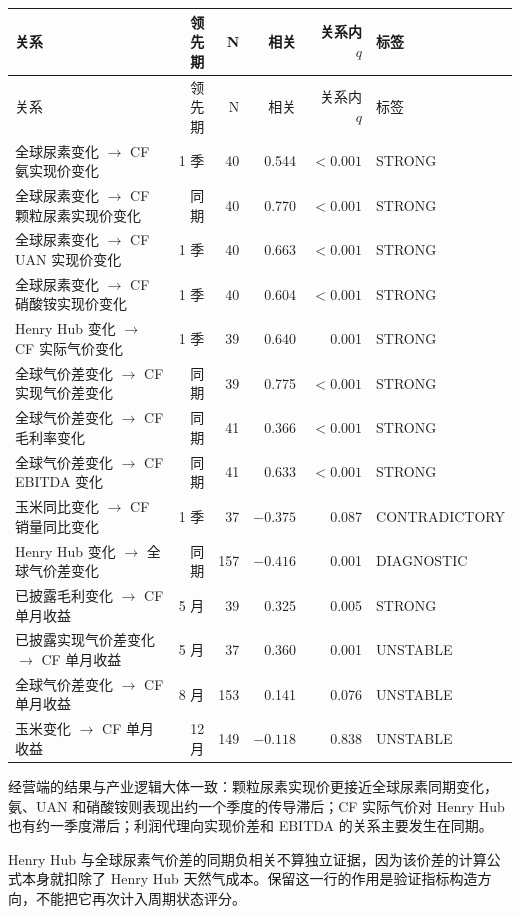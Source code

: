 \documentclass[11pt,a4paper]{ctexart}
\begin{document}
\small
\begin{longtable}{L{5.4cm}r r r r L{1.8cm}}
\toprule
关系 & 领先期 & N & 相关 & 关系内 $q$ & 标签 \\
\midrule
\endfirsthead
\toprule
关系 & 领先期 & N & 相关 & 关系内 $q$ & 标签 \\
\midrule
\endhead
全球尿素变化 $\rightarrow$ CF 氨实现价变化 & 1 季 & 40 & 0.544 & $<0.001$ & STRONG \\
全球尿素变化 $\rightarrow$ CF 颗粒尿素实现价变化 & 同期 & 40 & 0.770 & $<0.001$ & STRONG \\
全球尿素变化 $\rightarrow$ CF UAN 实现价变化 & 1 季 & 40 & 0.663 & $<0.001$ & STRONG \\
全球尿素变化 $\rightarrow$ CF 硝酸铵实现价变化 & 1 季 & 40 & 0.604 & $<0.001$ & STRONG \\
Henry Hub 变化 $\rightarrow$ CF 实际气价变化 & 1 季 & 39 & 0.640 & 0.001 & STRONG \\
全球气价差变化 $\rightarrow$ CF 实现气价差变化 & 同期 & 39 & 0.775 & $<0.001$ & STRONG \\
全球气价差变化 $\rightarrow$ CF 毛利率变化 & 同期 & 41 & 0.366 & $<0.001$ & STRONG \\
全球气价差变化 $\rightarrow$ CF EBITDA 变化 & 同期 & 41 & 0.633 & $<0.001$ & STRONG \\
玉米同比变化 $\rightarrow$ CF 销量同比变化 & 1 季 & 37 & $-0.375$ & 0.087 & CONTRADICTORY \\
Henry Hub 变化 $\rightarrow$ 全球气价差变化 & 同期 & 157 & $-0.416$ & 0.001 & DIAGNOSTIC \\
已披露毛利变化 $\rightarrow$ CF 单月收益 & 5 月 & 39 & 0.325 & 0.005 & STRONG \\
已披露实现气价差变化 $\rightarrow$ CF 单月收益 & 5 月 & 37 & 0.360 & 0.001 & UNSTABLE \\
全球气价差变化 $\rightarrow$ CF 单月收益 & 8 月 & 153 & 0.141 & 0.076 & UNSTABLE \\
玉米变化 $\rightarrow$ CF 单月收益 & 12 月 & 149 & $-0.118$ & 0.838 & UNSTABLE \\
\bottomrule
\end{longtable}
\normalsize

经营端的结果与产业逻辑大体一致：颗粒尿素实现价更接近全球尿素同期变化，氨、UAN 和硝酸铵则表现出约一个季度的传导滞后；CF 实际气价对 Henry Hub 也有约一季度滞后；利润代理向实现价差和 EBITDA 的关系主要发生在同期。

Henry Hub 与全球尿素气价差的同期负相关不算独立证据，因为该价差的计算公式本身就扣除了 Henry Hub 天然气成本。保留这一行的作用是验证指标构造方向，不能把它再次计入周期状态评分。
\end{document}
